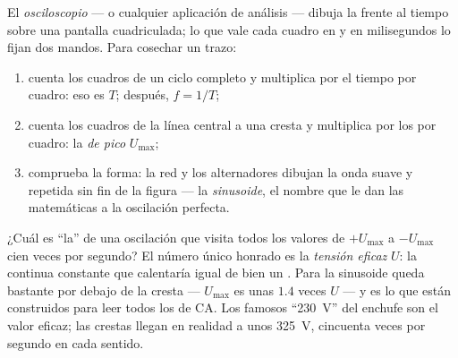 \begin{method}\label{met:g9:alternating-current:scope}
El \emph{osciloscopio} --- o cualquier aplicación
de análisis --- dibuja la  frente al tiempo sobre una
pantalla cuadriculada; lo que vale cada cuadro en  y en
milisegundos lo fijan dos mandos. Para cosechar un trazo:
\begin{enumerate}
  \item cuenta los cuadros de un ciclo completo y multiplica por el
        tiempo por cuadro: eso es $T$; después, $f = 1/T$;
  \item cuenta los cuadros de la línea central a una cresta y
        multiplica por los  por cuadro: la \emph{ de
        pico} $U_{\text{max}}$;
  \item comprueba la forma: la red y los alternadores dibujan la
        onda suave y repetida sin fin de la figura --- la
        \emph{sinusoide}, el nombre que le dan las matemáticas a la
        oscilación perfecta.
\end{enumerate}
\end{method}

\begin{proposition}\label{prop:g9:alternating-current:effective}
¿Cuál es ``la''  de una oscilación que visita todos los
valores de $+U_{\text{max}}$ a $-U_{\text{max}}$ cien veces por
segundo? El número único honrado es la \emph{tensión
eficaz} $U$: la  continua constante
que calentaría igual de bien un . Para la
sinusoide queda bastante por debajo de la cresta --- $U_{\text{max}}$
es unas $1.4$ veces $U$ --- y es lo que están construidos para leer
todos los  de CA. Los famosos ``\qty{230}{V}'' del
enchufe son el valor eficaz; las crestas llegan en realidad a unos
\qty{325}{V}, cincuenta veces por segundo en cada sentido.
\end{proposition}


